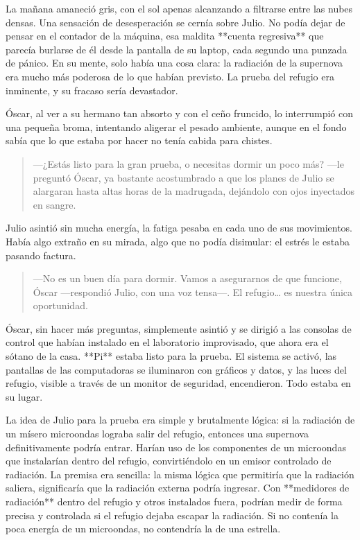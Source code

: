 \documentclass[a4paper,12pt]{book}
\begin{document}
La mañana amaneció gris, con el sol apenas alcanzando a filtrarse entre las nubes densas. Una sensación de desesperación se cernía sobre Julio. No podía dejar de pensar en el contador de la máquina, esa maldita **cuenta regresiva** que parecía burlarse de él desde la pantalla de su laptop, cada segundo una punzada de pánico. En su mente, solo había una cosa clara: la radiación de la supernova era mucho más poderosa de lo que habían previsto. La prueba del refugio era inminente, y su fracaso sería devastador.

Óscar, al ver a su hermano tan absorto y con el ceño fruncido, lo interrumpió con una pequeña broma, intentando aligerar el pesado ambiente, aunque en el fondo sabía que lo que estaba por hacer no tenía cabida para chistes.

\begin{quote}
    —¿Estás listo para la gran prueba, o necesitas dormir un poco más? —le preguntó Óscar, ya bastante acostumbrado a que los planes de Julio se alargaran hasta altas horas de la madrugada, dejándolo con ojos inyectados en sangre.
\end{quote}

Julio asintió sin mucha energía, la fatiga pesaba en cada uno de sus movimientos. Había algo extraño en su mirada, algo que no podía disimular: el estrés le estaba pasando factura.

\begin{quote}
    —No es un buen día para dormir. Vamos a asegurarnos de que funcione, Óscar —respondió Julio, con una voz tensa—. El refugio… es nuestra única oportunidad.
\end{quote}

Óscar, sin hacer más preguntas, simplemente asintió y se dirigió a las consolas de control que habían instalado en el laboratorio improvisado, que ahora era el sótano de la casa. **Pi** estaba listo para la prueba. El sistema se activó, las pantallas de las computadoras se iluminaron con gráficos y datos, y las luces del refugio, visible a través de un monitor de seguridad, encendieron. Todo estaba en su lugar.

La idea de Julio para la prueba era simple y brutalmente lógica: si la radiación de un mísero microondas lograba salir del refugio, entonces una supernova definitivamente podría entrar. Harían uso de los componentes de un microondas que instalarían dentro del refugio, convirtiéndolo en un emisor controlado de radiación. La premisa era sencilla: la misma lógica que permitiría que la radiación saliera, significaría que la radiación externa podría ingresar. Con **medidores de radiación** dentro del refugio y otros instalados fuera, podrían medir de forma precisa y controlada si el refugio dejaba escapar la radiación. Si no contenía la poca energía de un microondas, no contendría la de una estrella.
\end{document}
